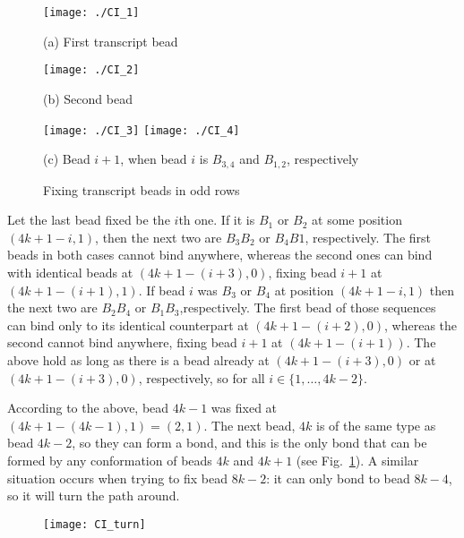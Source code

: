 \documentclass[]{llncs}
\begin{document}
\begin{figure}
\begin{minipage}{.35\textwidth}
	\centering
	\texttt{[image: ./CI\_1]}\\
	\bigskip

	(a) First transcript bead
\end{minipage}%
\begin{minipage}{.2\textwidth}
	\centering
	\texttt{[image: ./CI\_2]}\\
	\bigskip

	(b) Second bead
\end{minipage}
\begin{minipage}{.4\textwidth}
	\centering
	\texttt{[image: ./CI\_3]}
	\bigskip
	\vspace{0.1in}
	\texttt{[image: ./CI\_4]}
	\bigskip

	(c) Bead $i+1$, when bead $i$ is $B_{3,4}$ and $B_{1,2}$, respectively
\end{minipage}
\caption{Fixing transcript beads in odd rows}

\end{figure}


Let the last bead fixed be the $i$th one.
If it is $B_1$ or $B_2$ at some position $(4k+1-i,1)$, then the next two are $B_3B_2$ or $B_4B1$, respectively. The first beads in both cases cannot bind anywhere, whereas the second ones can bind with identical beads at $(4k+1-(i+3),0)$, fixing bead $i+1$ at $(4k+1-(i+1),1)$.
If bead $i$ was $B_3$ or $B_4$ at position $(4k+1-i,1)$ then the next two are $B_2B_4$ or $B_1B_3$,respectively. The first bead of those sequences can bind only to its identical counterpart at $(4k+1-(i+2),0)$, whereas the second cannot bind anywhere, fixing bead $i+1$ at $(4k+1-(i+1))$. The above hold as long as there is a bead already at $(4k+1-(i+3),0)$ or at $(4k+1-(i+3),0)$, respectively, so for all $i\in \{1,\dots, 4k-2\}$.

According to the above, bead $4k-1$ was fixed at $(4k+1-(4k-1),1)=(2,1)$. The next bead, $4k$ is of the same type as bead $4k-2$, so they can form a bond, and this is the only bond that can be formed by any conformation of beads $4k$ and $4k+1$ (see Fig.~\ref{fig:citurn}). A similar situation occurs when trying to fix bead $8k-2$: it can only bond to bead $8k-4$, so it will turn the path around.
\begin{figure}
	\centering
	\texttt{[image: CI\_turn]}
	\caption{}
	\label{fig:citurn}
\end{figure}
\end{document}
